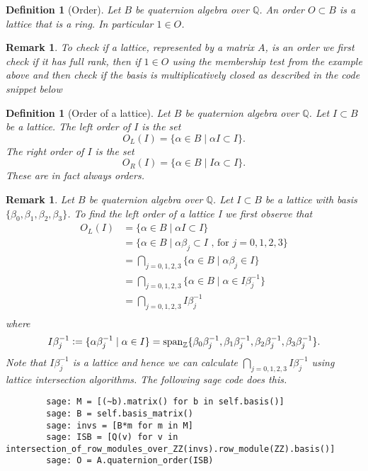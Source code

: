 \documentclass[10pt]{article}
\theoremstyle{plain}
\newtheorem{remark}[theorem]{Remark}
\newtheorem{definition}[theorem]{Definition}
\theoremstyle{definition}
\newcommand{\op}{\operatorname}
\newcommand{\Z}{\mathbb{Z}}
\newcommand{\Q}{\mathbb{Q}}
\begin{document}
\begin{definition}[Order]
    Let \( B \) be quaternion algebra over \( \Q \).
    An \emph{order} \( O \subset B \) is a lattice that is a ring.
    In particular \( 1 \in O \).
\end{definition}

\begin{remark}
    To check if a lattice, represented by a matrix \( A \), is an order we first check if it has full rank, then if \( 1 \in O \) using the membership test from the example above and then check if the basis is multiplicatively closed as described in the code snippet below
\end{remark}

\begin{definition}[Order of a lattice]
    Let \( B \) be quaternion algebra over \( \Q \).
    Let \( I \subset B  \) be a lattice.
    The \emph{left order} of \( I \) is the set
    \[
        O_L(I) = \{\alpha \in B \mid \alpha I \subset I\}.
    \]
    The \emph{right order} of \( I \) is the set
    \[
        O_R(I) = \{ \alpha \in B \mid I \alpha \subset I \}.
    \]
    These are in fact always orders.
\end{definition}

\begin{remark}
    Let \( B \) be quaternion algebra over \( \Q \).
    Let \( I \subset B  \) be a lattice with basis \( \{ \beta_0, \beta_1, \beta_2, \beta_3 \} \).
    To find the left order of a lattice I we first observe that
    \begin{align*}
        O_L(I)
          & = \{ \alpha \in B \mid \alpha I \subset I \}                                    \\
          & = \{ \alpha \in B \mid \alpha \beta_j \subset I \text{ , for } j = 0, 1, 2, 3\} \\
          & = \bigcap_{j = 0, 1, 2, 3} \{ \alpha \in B \mid \alpha \beta_j  \in I \}        \\
          & = \bigcap_{j = 0, 1, 2, 3} \{ \alpha \in B \mid \alpha  \in I\beta_j^{-1} \}    \\
          & = \bigcap_{j = 0, 1, 2, 3} I\beta_j^{-1}                                        \\
    \end{align*}
    where
    \[
        I\beta_j^{-1}
        \vcentcolon = \{\alpha \beta_j^{-1} \mid \alpha \in I \}
        = \op{span}_\Z\{\beta_0\beta_j^{-1}, \beta_1\beta_j^{-1}, \beta_2\beta_j^{-1}, \beta_3\beta_j^{-1} \}.
    \]
    Note that \( I\beta_j^{-1} \) is a lattice and hence we can calculate \( \bigcap_{j = 0, 1, 2, 3} I\beta_j^{-1}  \) using lattice intersection algorithms.
    The following sage code does this.
    \begin{lstlisting}
        sage: M = [(~b).matrix() for b in self.basis()]
        sage: B = self.basis_matrix()
        sage: invs = [B*m for m in M]
        sage: ISB = [Q(v) for v in intersection_of_row_modules_over_ZZ(invs).row_module(ZZ).basis()]
        sage: O = A.quaternion_order(ISB)
  \end{lstlisting}
\end{remark}
\end{document}
